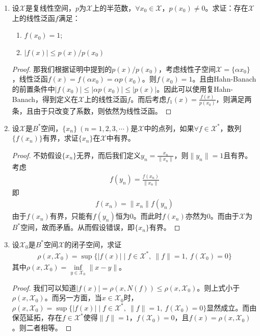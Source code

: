 \begin{enumerate}[leftmargin=2cm, label=\arabic*]
    \item 设$\mathscr{X}$是复线性空间，$p$为$\mathscr{X}$上的半范数，$\forall x_0\in\mathscr{X}$，$p(x_0)\neq 0$。求证：存在$\mathscr{X}$上的线性泛函$f$满足：
    \begin{enumerate}[leftmargin=1cm, label=(\arabic*)]
        \item $f(x_0) = 1$;
        \item $|f(x)|\leqslant p(x)/p(x_0)$
    \end{enumerate}
    \begin{proof}
        那我们根据证明中提到的$p(x)/p(x_0)$，考虑线性子空间$\mathscr{X}=\{\alpha x_0\}$，线性泛函$f(x) = f(\alpha x_0) = \alpha p(x_0)$。则$f(x_0) = 1$。且由Hahn-Banach的前置条件中$|f(x_0)| \leqslant |\alpha p(x_0)| \leqslant |p(x)|$。因此可以使用复Hahn-Banach，得到定义在$\mathscr{X}$上的线性泛函$f$。而后考虑$f_1(x) = \frac{f(x)}{p(x_0)}$，则满足两条，且由于只改变了系数，则依然为线性泛函。
    \end{proof}

    \item 设$\mathscr{X}$是$B^*$空间，$\{x_n\}\ (n=1,2,3,\cdots)$是$\mathscr{X}$中的点列，如果$\forall f\in\mathscr{X}^*$，数列$\{f(x_n)\}$有界，求证$\{x_n\}$在$\mathscr{X}$中有界。
    \begin{proof}
        不妨假设$\{x_n\}$无界，而后我们定义$y_n = \frac{x_n}{\|x_n\|}$，则$\|y_n\|= 1$且有界。考虑
        \begin{align*}
            f(y_n) = \frac{f(x_n)}{\|x_n\|}
        \end{align*}
        即
        \begin{align*}
            f(x_n) = \|x_n\| f(y_n)
        \end{align*}
        由于$f(x_n)$有界，只能有$f(y_n)$恒为$0$。而此时$f(x_n)$亦然为$0$。而由于$\mathscr{X}$为$B^*$空间，故而矛盾。从而假设错误，即$\{x_n\}$有界。
    \end{proof}

    \item 设$\mathscr{X}_0$是$B^*$空间$\mathscr{X}$的闭子空间，求证
    \begin{align*}
        \rho(x,\mathscr{X}_0) = \sup \{|f(x)| \mid f\in \mathscr{X}^*,\ \|f\| = 1,\ f(\mathscr{X}_0) = 0\}
    \end{align*}
    其中$\rho(x,\mathscr{X}_0) = \inf\limits_{y\in\mathscr{X}_0} \|x - y\|$。
    \begin{proof}
        我们可以知道$|f(x)| = \rho(x,N(f)) \leqslant \rho(x,\mathscr{X}_0)$。则上式小于$\rho(x,\mathscr{X}_0)$。而另一方面，当$x\in\mathscr{X}_0$时，$\rho(x,\mathscr{X}_0) = \sup \{|f(x)| \mid f\in \mathscr{X}^*,\ \|f\| = 1,\ f(\mathscr{X}_0) = 0\}$显然成立。而由保范延拓，存在$f\in\mathscr{X}^*$使得$\|f\| = 1$，$f(\mathscr{X}_0) = 0$，且$f(x) = \rho(x,\mathscr{X}_0)$。则二者相等。
    \end{proof}


\end{enumerate}
